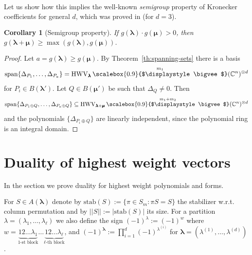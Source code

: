 \documentclass[12pt, reqno]{amsart}
\newtheorem{corollary}[theorem]{Corollary}
\theoremstyle{definition}
\let\oldbigvee\bigvee
\renewcommand{\bigvee}{
  \mathop{
    \vcenter{
      \hbox{\scalebox{0.9}{$\displaystyle\oldbigvee$}}
    }
  }
}
\begin{document}
Let us show how this implies the well-known {\it semigroup} property of Kronecker coefficients for general $d$, which was proved in \cite{chm} (for $d = 3$).
\begin{corollary}[Semigroup property]
    If $g(\pmb{\lambda}) \cdot g(\pmb{\mu}) > 0$, then $g(\pmb{\lambda} + \pmb{\mu}) \ge \max(g(\pmb{\lambda}), g(\pmb{\mu}))$.
\end{corollary}
\begin{proof}
    Let $a = g(\pmb{\lambda}) \ge g(\pmb{\mu})$. By Theorem~\ref{th:spanning-sets} there is a basis 
    $$
    \mathrm{span}\{\Delta_{P_1},\ldots, \Delta_{P_a}\}
    = \mathrm{HWV}_{\pmb{\lambda}} \bigvee^{m_1} (\mathbb{C}^{n})^{\otimes d}
    $$
    for $P_i \in B(\pmb{\lambda'})$. Let $Q \in B(\pmb{\mu'})$ be such that $\Delta_Q \neq 0$. Then
    $$
    \mathrm{span}\{\Delta_{P_1 \oplus Q},\ldots, \Delta_{P_a \oplus Q}\} 
    \subseteq 
    \mathrm{HWV}_{\pmb{\lambda} + \pmb{\mu}}
        \bigvee^{m_1+m_2} 
        (\mathbb{C}^{n})^{\otimes d}
    $$
    and the polynomials $\{\Delta_{P_i\oplus Q}\}$ are linearly independent, since the polynomial ring is an integral domain.
\end{proof}





\section{Duality of highest weight vectors}\label{sec:duality}

In the section we prove duality for highest weight polynomials and forms. %

\vspace{0.5em}


For $S \in A(\pmb{\lambda})$ denote by $\mathrm{stab}(S) := \{ \pi \in S_m: \pi S = S \}$ the stabilizer w.r.t. column permutation and by $||S|| := |\mathrm{stab}(S)|$ its size.
For a partition $\lambda = (\lambda_1, \ldots, \lambda_{\ell})$ we also define the sign $(-1)^{\lambda} := (-1)^{w}$ where $w = \underbrace{12\ldots \lambda_1}_{1\text{-st block}}\ldots \underbrace{12\ldots\lambda_{\ell}}_{\ell\text{-th block}}$, and $(-1)^{\pmb{\lambda}} := \prod_{i =1}^{d} (-1)^{\lambda^{(i)}}$ for $\pmb{\lambda} = (\lambda^{(1)}, \ldots, \lambda^{(d)})$. %
\end{document}
